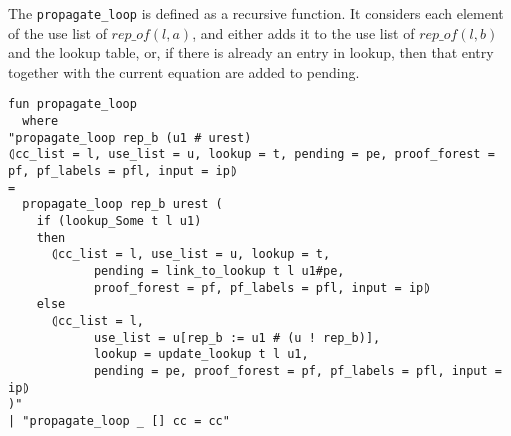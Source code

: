 The \lstinline|propagate_loop| is defined as a recursive function. It considers each element of the use list of $rep\_of(l, a)$, and either adds it to the use list of $rep\_of(l, b)$ and the lookup table, or, if there is already an entry in lookup, then that entry together with the current equation are added to pending.

\begin{lstlisting}
fun propagate_loop
  where
"propagate_loop rep_b (u1 # urest)
⦇cc_list = l, use_list = u, lookup = t, pending = pe, proof_forest = pf, pf_labels = pfl, input = ip⦈
=
  propagate_loop rep_b urest (
    if (lookup_Some t l u1)
    then
      ⦇cc_list = l, use_list = u, lookup = t,
            pending = link_to_lookup t l u1#pe,
            proof_forest = pf, pf_labels = pfl, input = ip⦈
    else
      ⦇cc_list = l,
            use_list = u[rep_b := u1 # (u ! rep_b)],
            lookup = update_lookup t l u1,
            pending = pe, proof_forest = pf, pf_labels = pfl, input = ip⦈
)"
| "propagate_loop _ [] cc = cc"
\end{lstlisting}

